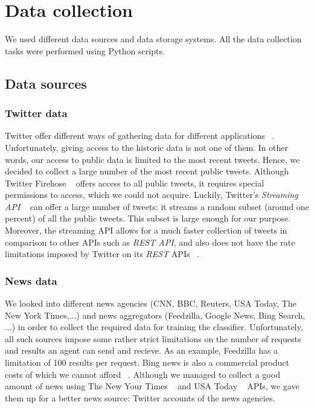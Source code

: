 \documentclass{llncs}
\begin{document}
\section{Data collection}
We used different data sources and data storage systems. All the data collection tasks were performed using Python scripts.
\subsection{Data sources}
\subsubsection{Twitter data}
Twitter offer different ways of gathering data for different applications ~\cite{twitterdocumentation}. Unfortunately, giving access to the historic data is not one of them. In other words, our access to public data is limited to the most recent tweets. Hence, we decided to collect a large number of the most recent public tweets. 
Although Twitter Firehose ~\cite{twitterrestapi} offers access to all public tweets, it requires special permissions to access, which we could not acquire. Luckily, Twitter's \textit{Streaming API} ~\cite{twitterstreaming} can offer a large number of tweets: it streams a random subset (around one percent) of all the public tweets. This subset is large enough for our purpose. Moreover, the streaming API allows for a much faster collection of tweets in comparison to other APIs such as \textit{REST API}, and also does not have the rate limitations imposed by Twitter on its \textit{REST} APIs ~\cite{twitterdocumentation}. 


\subsubsection{News data}
We looked into different news agencies (CNN, BBC, Reuters, USA Today, The New York Times,...) and news aggregators (Feedzilla, Google News, Bing Search, ...) in order to collect the required data for training the classifier. Unfortunately, all such sources impose some rather strict limitations on the number of requests and results an agent can send and recieve. As an example, Feedzilla has a limitation of 100 results per request. Bing news is also a commercial product costs of which we cannot afford ~\cite{bingsearchapi}. Although we managed to collect a good amount of news using The New Your Times ~\cite{thenytimes} and USA Today ~\cite{thenytimes} APIs, we gave them up for a better news source: Twitter accounts of the news agencies. 
\end{document}
